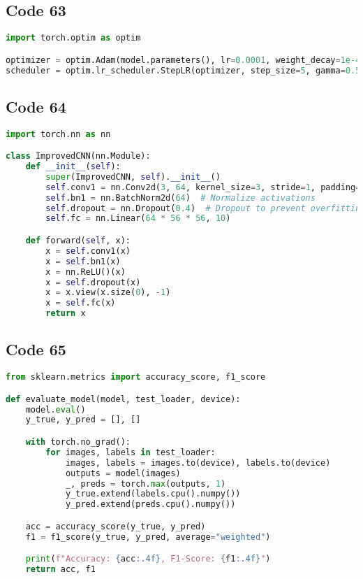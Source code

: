 \documentclass{article}
\begin{document}
\subsection*{Code 63}
\begin{lstlisting}[language=Python]
import torch.optim as optim

optimizer = optim.Adam(model.parameters(), lr=0.0001, weight_decay=1e-4)
scheduler = optim.lr_scheduler.StepLR(optimizer, step_size=5, gamma=0.5)  # Reduce LR every 5 epochs

\end{lstlisting}

\subsection*{Code 64}
\begin{lstlisting}[language=Python]
import torch.nn as nn

class ImprovedCNN(nn.Module):
    def __init__(self):
        super(ImprovedCNN, self).__init__()
        self.conv1 = nn.Conv2d(3, 64, kernel_size=3, stride=1, padding=1)
        self.bn1 = nn.BatchNorm2d(64)  # Normalize activations
        self.dropout = nn.Dropout(0.4)  # Dropout to prevent overfitting
        self.fc = nn.Linear(64 * 56 * 56, 10)

    def forward(self, x):
        x = self.conv1(x)
        x = self.bn1(x)
        x = nn.ReLU()(x)
        x = self.dropout(x)
        x = x.view(x.size(0), -1)
        x = self.fc(x)
        return x

\end{lstlisting}

\subsection*{Code 65}
\begin{lstlisting}[language=Python]
from sklearn.metrics import accuracy_score, f1_score

def evaluate_model(model, test_loader, device):
    model.eval()
    y_true, y_pred = [], []

    with torch.no_grad():
        for images, labels in test_loader:
            images, labels = images.to(device), labels.to(device)
            outputs = model(images)
            _, preds = torch.max(outputs, 1)
            y_true.extend(labels.cpu().numpy())
            y_pred.extend(preds.cpu().numpy())

    acc = accuracy_score(y_true, y_pred)
    f1 = f1_score(y_true, y_pred, average="weighted")

    print(f"Accuracy: {acc:.4f}, F1-Score: {f1:.4f}")
    return acc, f1

\end{lstlisting}
\end{document}

